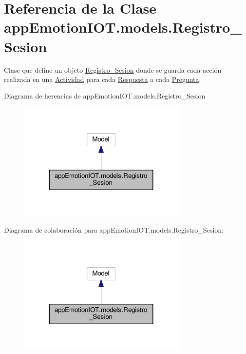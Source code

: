 \hypertarget{classappEmotionIOT_1_1models_1_1Registro__Sesion}{}\section{Referencia de la Clase app\+Emotion\+I\+O\+T.\+models.\+Registro\+\_\+\+Sesion}
\label{classappEmotionIOT_1_1models_1_1Registro__Sesion}


Clase que define un objeto \hyperlink{classappEmotionIOT_1_1models_1_1Registro__Sesion}{Registro\+\_\+\+Sesion} donde se guarda cada acción realizada en una \hyperlink{classappEmotionIOT_1_1models_1_1Actividad}{Actividad} para cada \hyperlink{classappEmotionIOT_1_1models_1_1Respuesta}{Respuesta} a cada \hyperlink{classappEmotionIOT_1_1models_1_1Pregunta}{Pregunta}.  




Diagrama de herencias de app\+Emotion\+I\+O\+T.\+models.\+Registro\+\_\+\+Sesion
\nopagebreak
\begin{figure}[H]
\begin{center}
\leavevmode
\includegraphics[width=239pt]{classappEmotionIOT_1_1models_1_1Registro__Sesion__inherit__graph}
\end{center}
\end{figure}


Diagrama de colaboración para app\+Emotion\+I\+O\+T.\+models.\+Registro\+\_\+\+Sesion\+:
\nopagebreak
\begin{figure}[H]
\begin{center}
\leavevmode
\includegraphics[width=239pt]{classappEmotionIOT_1_1models_1_1Registro__Sesion__coll__graph}
\end{center}
\end{figure}
